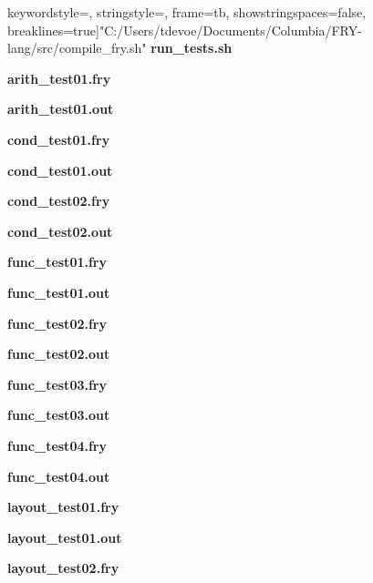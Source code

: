 \documentclass{article}
\begin{document}
keywordstyle=\ttb\color{deepblue},
stringstyle=\color{deepgreen},
frame=tb,
showstringspaces=false,
breaklines=true]{"C:/Users/tdevoe/Documents/Columbia/FRY-lang/src/compile_fry.sh"}
\label{ref:runtests}
{\large \textbf{run\_tests.sh}}

\label{ref:tests}
{\large \textbf{arith\_test01.fry}}

{\large \textbf{arith\_test01.out}}

{\large \textbf{cond\_test01.fry}}

{\large \textbf{cond\_test01.out}}

{\large \textbf{cond\_test02.fry}}

{\large \textbf{cond\_test02.out}}

{\large \textbf{func\_test01.fry}}

{\large \textbf{func\_test01.out}}

{\large \textbf{func\_test02.fry}}

{\large \textbf{func\_test02.out}}

{\large \textbf{func\_test03.fry}}

{\large \textbf{func\_test03.out}}

{\large \textbf{func\_test04.fry}}

{\large \textbf{func\_test04.out}}

{\large \textbf{layout\_test01.fry}}

{\large \textbf{layout\_test01.out}}

{\large \textbf{layout\_test02.fry}}

\end{document}
